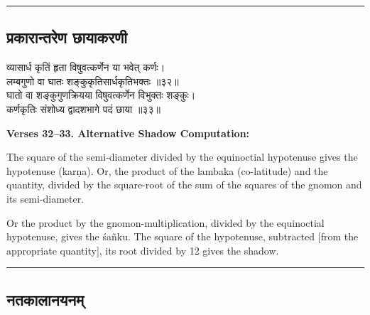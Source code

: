 \documentclass[11pt,a4paper]{article}
\newcommand{\longline}{\noindent\rule{\textwidth}{0.4pt}}
\newcommand{\dev}[1]{{\devanagarifont #1}}
\newcommand{\sectsep}{\par\vspace{0.8em}\longline\vspace{0.8em}}
\begin{document}
\sectsep

\subsection{\dev{प्रकारान्तरेण छायाकरणी}}

\begin{minipage}[t]{0.48\textwidth}
\small\devanagarifont
व्यासार्ध कृतिं हृता विषुवत्कर्णेन या भवेत् कर्णः।\\
लम्बगुणो वा घातः शङ्कुकृतिसार्धकृतिभक्तः ॥३२॥\\[0.5em]
घातो वा शङ्कुगुणक्रियया विषुवत्कर्णेन विभुक्तः शङ्कुः।\\
कर्णकृतिः संशोध्य द्वादशभागे पदं छाया ॥३३॥
\end{minipage}%
\hfill
\begin{minipage}[t]{0.48\textwidth}
\small
\textbf{Verses 32--33. Alternative Shadow Computation:}

The square of the semi-diameter divided by the equinoctial hypotenuse gives the hypotenuse (kar\d{n}a). Or, the product of the lambaka (co-latitude) and the quantity, divided by the square-root of the sum of the squares of the gnomon and its semi-diameter.

Or the product by the gnomon-multiplication, divided by the equinoctial hypotenuse, gives the \'sa\~nku. The square of the hypotenuse, subtracted [from the appropriate quantity], its root divided by 12 gives the shadow.
\end{minipage}

\sectsep

\subsection{\dev{नतकालानयनम्}}
\end{document}
